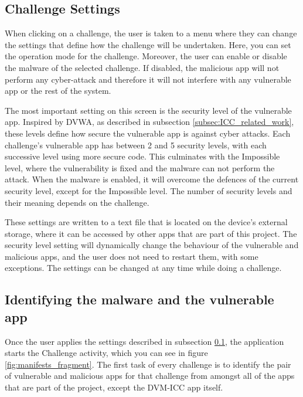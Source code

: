     \subsection{Challenge Settings}
        \label{subsec:challenge_settings}
        
    When clicking on a challenge, the user is taken to a menu where they can change the settings that define how the challenge will be undertaken. Here, you can set the operation mode for the challenge. Moreover, the user can enable or disable the malware of the selected challenge. If disabled, the malicious app will not perform any cyber-attack and therefore it will not interfere with any vulnerable app or the rest of the system.
    
    The most important setting on this screen is the security level of the vulnerable app. Inspired by DVWA, as described in subsection \ref{subsec:ICC_related_work}, these levels define how secure the vulnerable app is against cyber attacks. Each challenge's vulnerable app has between 2 and 5 security levels, with each successive level using more secure code. This culminates with the Impossible level, where the vulnerability is fixed and the malware can not perform the attack. When the malware is enabled, it will overcome the defences of the current security level, except for the Impossible level. The number of security levels and their meaning depends on the challenge.
    
    These settings are written to a text file that is located on the device's external storage, where it can be accessed by other apps that are part of this project. The security level setting will dynamically change the behaviour of the vulnerable and malicious apps, and the user does not need to restart them, with some exceptions. The settings can be changed at any time while doing a challenge.
    
    \subsection{Identifying the malware and the vulnerable app}
        \label{subsec:identify_challenge_apps}
        
    Once the user applies the settings described in subsection \ref{subsec:challenge_settings}, the application starts the Challenge activity, which you can see in figure \ref{fig:manifests_fragment}. The first task of every challenge is to identify the pair of vulnerable and malicious apps for that challenge from amongst all of the apps that are part of the project, except the DVM-ICC app itself. 
    
